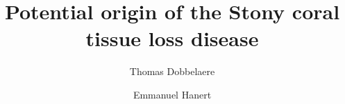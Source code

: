 \documentclass[preprint,12pt,authoryear]{elsarticle}
\begin{document}
\begin{frontmatter}



    \title{Potential origin of the Stony coral tissue loss disease}%


    \author[eli]{Thomas Dobbelaere}
    \author[eli,immc]{Emmanuel Hanert}


\end{frontmatter}
\end{document}

